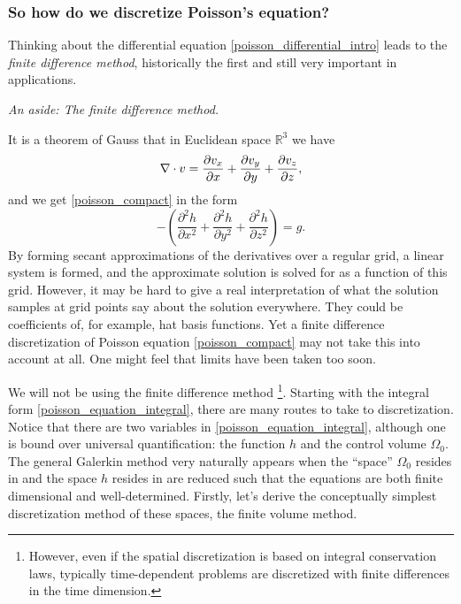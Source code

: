 \subsubsection{So how do we discretize Poisson's equation?}
Thinking about the differential equation \eqref{poisson_differential_intro} leads to the \textit{finite difference method}, historically the first and
still very important in applications.

\begin{aside}
\textit{An aside: The finite difference method.}
\vskip 0.05in

\noindent
It is a theorem of Gauss that in Euclidean space $\mathbb{R}^3$ we have
\begin{equation}\label{gauss_euclidean_divergence}
    \nabla \cdot v = \frac{\partial v_x}{\partial x} + \frac{\partial v_y}{\partial y} + \frac{\partial v_z}{\partial z},
\end{equation}
and we get \eqref{poisson_compact} in the form
\begin{equation}\label{poisson_differential_intro}
    -\left(\frac{\partial^2 h}{\partial x^2}
           +\frac{\partial^2 h}{\partial y^2}
           +\frac{\partial^2 h}{\partial z^2}\right) = g.
\end{equation}
By forming secant approximations of the derivatives over a regular grid,
a linear system is formed, and the approximate solution is solved
for as a function of this grid.
However, it may be hard to give a real interpretation of what the solution samples at grid points say about the solution everywhere.
They could be coefficients of, for example, hat basis functions.
Yet a finite difference discretization of Poisson equation \eqref{poisson_compact} may not take this into account at all. One might feel that
limits have been taken too soon.
\end{aside}

We will not be using the finite difference method
\footnote{However, even if the spatial discretization is based on integral conservation laws, typically time-dependent problems
          are discretized with finite differences in the time dimension.}.
Starting with the integral form \eqref{poisson_equation_integral}, there are many routes to take to discretization.
Notice that there are two variables in \eqref{poisson_equation_integral}, although one is bound over universal quantification:
the function $h$ and the control volume $\Omega_0$.
The general Galerkin method very naturally appears when the ``space'' $\Omega_0$ resides in and the space $h$ resides in are reduced
such that the equations are both finite dimensional and well-determined.
Firstly, let's derive the conceptually simplest
discretization method of these spaces, the finite volume method.

